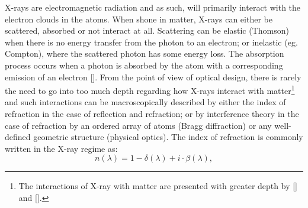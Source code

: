 \begin{refsection}
X-rays are electromagnetic radiation and as such, will primarily interact with the electron clouds in the atoms. When shone in matter, X-rays can either be scattered, absorbed or not interact at all. Scattering can be elastic (Thomson) when there is no energy transfer from the photon to an electron; or inelastic (eg. Compton), where the scattered photon has some energy loss. The absorption process occurs when a photon is absorbed by the atom with a corresponding emission of an electron [\cite[\textit{§1.2}-\textit{§1.3}]{Als-Nielsen2011}]. From the point of view of optical design, there is rarely the need to go into too much depth regarding how X-rays interact with matter\footnote{The interactions of X-ray with matter are presented with greater depth by [\cite[\textit{§1}]{Als-Nielsen2011}] and [\cite[\textit{§1} - \textit{§3}]{Attwood2016}].} and such interactions can be macroscopically described by either the index of refraction in the case of reflection and refraction; or by interference theory in the case of refraction by an ordered array of atoms (Bragg diffraction) or any well-defined geometric structure (physical optics). The index of refraction is commonly written in the X-ray regime as:
\begin{equation}
    n(\lambda)=1-\delta(\lambda)+i\cdot\beta(\lambda),
\end{equation}

\end{refsection}
